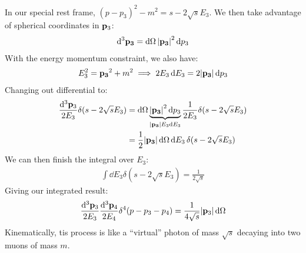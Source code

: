In our special rest frame, ${(p-p_3)}^2-m^2=s-2\sqrt{s}E_3$. We then take advantage of spherical coordinates in $\vb{p}_3$:
\begin{align*}
  \dd[3]{\vb{p_3}}=\dd{\Omega}\abs{\vb{p_3}}^2\dd{p_3}
\end{align*}
With the energy momentum constraint, we also have:
\begin{align*}
  E^2_3=\vb{p_3}^2+m^2\implies 2E_3\dd{E_3}=2\abs{\vb{p_3}}\dd{p_3}
\end{align*}
Changing out differential to:
\begin{align*}
  \frac{\dd[3]{\vb{p}_3}}{2E_3}\delta(s-2\sqrt{s}E_3)
  &=\dd{\Omega}\underbrace{\abs{\vb{p_3}}^2\dd{p_3}}_{\abs{\vb{p_3}}E_3\dd{E_3}}
  \frac1{2E_3}\delta(s-2\sqrt{s}E_3)\\
  &=\frac12\abs{\vb{p_3}}\dd{\Omega}\dd{E_3}\delta(s-2\sqrt{s}E_3)
\end{align*}
We can then finish the integral over $E_3$:
\begin{align*}
  \int\dd{E_3}\delta(s-2\sqrt{s}E_3)=\frac{1}{2\sqrt{s}}
\end{align*}
Giving our integrated result:
\begin{align*}
  \frac{\dd[3]{\vb{p}_3}}{2E_3}\frac{\dd[3]{\vb{p}_4}}{2E_4}\delta^4(p-p_3-p_4)
  =\frac1{4\sqrt{s}}\abs{\vb{p}_3}\dd{\Omega}
\end{align*}
Kinematically, tis process is like a ``virtual'' photon of mass $\sqrt{s}$ decaying into two muons of mass $m$.

